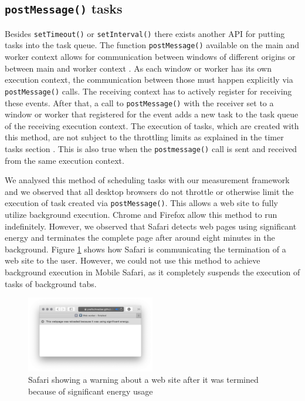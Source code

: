 \documentclass[
	ruledheaders=section,%
	class=report,%
	thesis={type=bachelor},%
	accentcolor=9c,%
	custommargins=true,%
	marginpar=false,%
	parskip=half-,%
	fontsize=11pt,%
]{tudapub}
\begin{document}
  \subsection{\texttt{postMessage()} tasks}

  Besides \texttt{setTimeout()} or \texttt{setInterval()} there exists another API for putting tasks into the task queue. The function \texttt{postMessage()} available on the main and worker context allows for communication between windows of different origins or between main and worker context \cite{mdn-postmessage}. As each window or worker has its own execution context, the communication between those must happen explicitly via \texttt{postMessage()} calls. The receiving context has to actively register for receiving these events. After that, a call to \texttt{postMessage()} with the receiver set to a window or worker that registered for the event adds a new task to the task queue of the receiving execution context. The execution of tasks, which are created with this method, are not subject to the throttling limits as explained in the timer tasks section \cite{zero-delay-timeouts}. This is also true when the \texttt{postmessage()} call is sent and received from the same execution context.

  We analysed this method of scheduling tasks with our measurement framework and we observed that all desktop browsers do not throttle or otherwise limit the execution of task created via \texttt{postMessage()}. This allows a web site to fully utilize background execution. Chrome and Firefox allow this method to run indefinitely. However, we observed that Safari detects web pages using significant energy and terminates the complete page after around eight minutes in the background. Figure \ref{fig:significant-energy} shows how Safari is communicating the termination of a web site to the user. However, we could not use this method to achieve background execution in Mobile Safari, as it completely suspends the execution of tasks of background tabs.

  \begin{figure}
    \centering
      \includegraphics[width=0.5\textwidth]{images/significant-energy.png}
    \caption{Safari showing a warning about a web site after it was termined because of significant energy usage}
    \label{fig:significant-energy}
  \end{figure}
\end{document}
